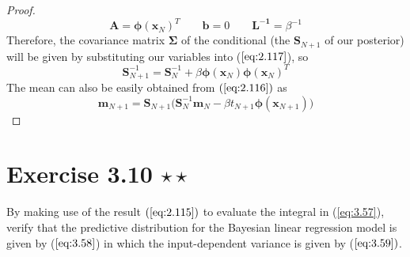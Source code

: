 \begin{proof}
\begin{equation*}
        \mathbf{A} = \bm{\phi}(\mathbf{x}_N)^T
        \hspace{2em}
        \mathbf{b} = 0
        \hspace{2em}
        \mathbf{L^{-1}} = \beta^{-1}
    \end{equation*}
    Therefore, the covariance matrix $\mathbf{\Sigma}$ of the conditional (the $\mathbf{S}_{N + 1}$ 
    of our posterior) will be given by substituting our variables into ($\ref{eq:2.117}$), so
    \begin{equation*}
        \mathbf{S}_{N + 1}^{-1} = \mathbf{S}_N^{-1} + \beta \bm{\phi}(\mathbf{x}_N)\bm{\phi}(\mathbf{x}_N)^T
    \end{equation*}
    The mean can also be easily obtained from $(\ref{eq:2.116})$ as
    \begin{equation*}
        \mathbf{m}_{N + 1}
        = \mathbf{S}_{N + 1}\big(\mathbf{S}_N^{-1} \mathbf{m}_N 
             - \beta t_{N + 1} \bm{\phi}(\mathbf{x}_{N + 1})\big)
    \end{equation*}
\end{proof}

\section*{Exercise 3.10 $\star \star$}
By making use of the result $(\ref{eq:2.115})$ to evaluate the integral
in (\ref{eq:3.57}), verify that the predictive distribution for the Bayesian linear
regression model is given by ($\ref{eq:3.58}$) in which the input-dependent variance is
given by ($\ref{eq:3.59})$.

\vspace{1em}

